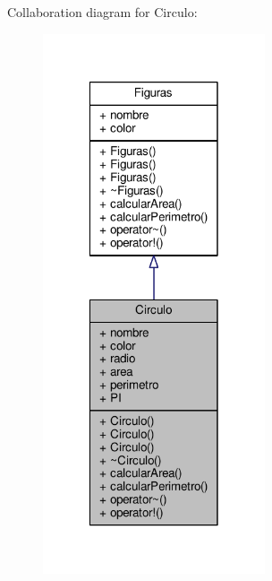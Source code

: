 Collaboration diagram for Circulo\+:
\nopagebreak
\begin{figure}[H]
\begin{center}
\leavevmode
\includegraphics[width=186pt]{class_circulo__coll__graph}
\end{center}
\end{figure}

